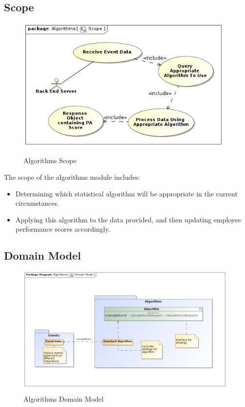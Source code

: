\documentclass[11pt,a4paper]{article}
\begin{document}
\subsection{Scope}
\begin{figure}[H]
	\begin{center}
		\includegraphics[scale=0.75]{../Images/Algorithms Scope.jpg}
		\caption{Algorithms Scope}
	\end{center}
\end{figure}
The scope of the algorithms module includes:
\begin{itemize}
	\item Determining which statistical algorithm will be appropriate in the current circumstances.
	\item Applying this algorithm to the data provided, and then updating employee performance scores accordingly.
\end{itemize}

\subsection{Domain Model}
\begin{figure}[H]
	\begin{center}
		\includegraphics[scale=0.5]{../Images/Algorithms_Domain_Model.jpg}
		\caption{Algorithms Domain Model}
	\end{center}
\end{figure}
\end{document}
